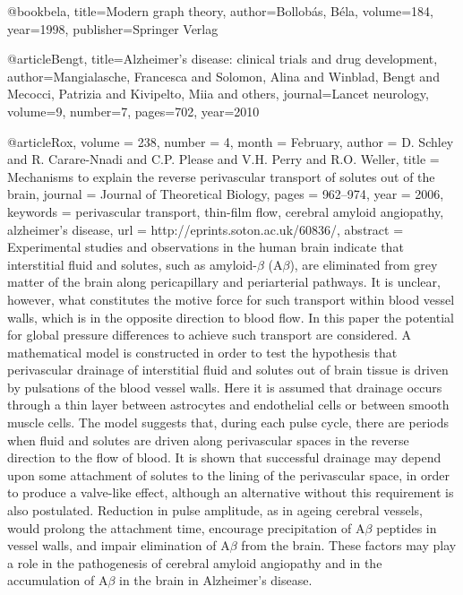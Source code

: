 @book{bela,
  title={Modern graph theory},
  author={Bollob{\'a}s, B{\'e}la},
  volume={184},
  year={1998},
  publisher={Springer Verlag}
}

@article{Bengt,
  title={Alzheimer's disease: clinical trials and drug development},
  author={Mangialasche, Francesca and Solomon, Alina and Winblad, Bengt and Mecocci, Patrizia and Kivipelto, Miia and others},
  journal={Lancet neurology},
  volume={9},
  number={7},
  pages={702},
  year={2010}
}

@article{Rox,
          volume = {238},
          number = {4},
           month = {February},
          author = {D. Schley and R. Carare-Nnadi and C.P. Please and V.H. Perry and R.O. Weller},
           title = {Mechanisms to explain the reverse perivascular transport of solutes out of the brain},
         journal = {Journal of Theoretical Biology},
           pages = {962--974},
            year = {2006},
        keywords = {perivascular transport, thin-film flow, cerebral amyloid angiopathy, alzheimer's disease},
             url = {http://eprints.soton.ac.uk/60836/},
        abstract = {Experimental studies and observations in the human brain indicate that interstitial fluid and solutes, such as amyloid-{\ensuremath{\beta}} (A{\ensuremath{\beta}}), are eliminated from grey matter of the brain along pericapillary and periarterial pathways. It is unclear, however, what constitutes the motive force for such transport within blood vessel walls, which is in the opposite direction to blood flow. In this paper the potential for global pressure differences to achieve such transport are considered. A mathematical model is constructed in order to test the hypothesis that perivascular drainage of interstitial fluid and solutes out of brain tissue is driven by pulsations of the blood vessel walls. Here it is assumed that drainage occurs through a thin layer between astrocytes and endothelial cells or between smooth muscle cells. The model suggests that, during each pulse cycle, there are periods when fluid and solutes are driven along perivascular spaces in the reverse direction to the flow of blood. It is shown that successful drainage may depend upon some attachment of solutes to the lining of the perivascular space, in order to produce a valve-like effect, although an alternative without this requirement is also postulated. Reduction in pulse amplitude, as in ageing cerebral vessels, would prolong the attachment time, encourage precipitation of A{\ensuremath{\beta}} peptides in vessel walls, and impair elimination of A{\ensuremath{\beta}} from the brain. These factors may play a role in the pathogenesis of cerebral amyloid angiopathy and in the accumulation of A{\ensuremath{\beta}} in the brain in Alzheimer's disease.}
}


